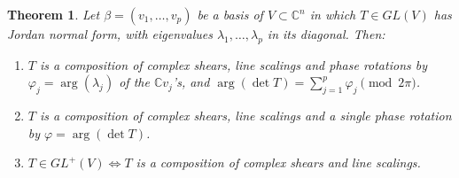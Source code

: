 \documentclass[10pt,a4paper]{amsart}
\newtheorem{theorem}{Theorem}
\def\C			{\mathds{C}}
\begin{document}
\begin{theorem}\label{pr:decomposition}
	Let $\beta = (v_1,\ldots,v_p)$ be a basis of $V \subset \C^n$ in which $T \in GL(V)$ has Jordan normal form, with eigenvalues $\lambda_1,\ldots,\lambda_p$ in its diagonal. 
	Then:
	\begin{enumerate}[label = (\roman*)]
		\item $T$ is a composition of complex shears, line scalings and phase rotations by $\varphi_j = \arg(\lambda_j)$ of the $\C v_j$'s,
		and $\arg(\det T) = \sum_{j=1}^p \varphi_j \pmod{2\pi}$. \label{it:T phases}
		
		\item $T$ is a composition of complex shears, line scalings and a single phase rotation by $\varphi = \arg(\det T)$. \label{it:T single phase}
		
		\item $T \in GL^+(V) \Leftrightarrow T$ is a composition of complex shears and line scalings. \label{it:GL+}
	\end{enumerate}
\end{theorem}
\end{document}
